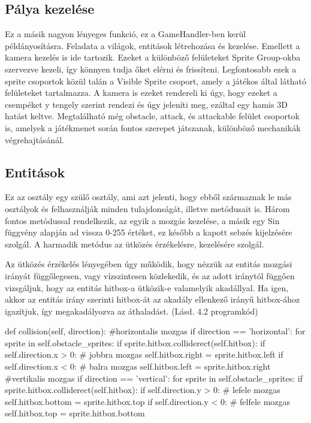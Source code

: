 \subsection{Pálya kezelése}
\indent \indent Ez a másik nagyon lényeges funkció, ez a GameHandler-ben kerül példányosításra. Feladata a világok, entitások létrehozása és kezelése. Emellett a kamera kezelés is ide tartozik. 
Ezeket a különböző felületeket Sprite Group-okba szervezve kezeli, így könnyen tudja őket elérni és frissíteni.
Legfontosabb ezek a sprite csoportok közül talán a Visible Sprite csoport, amely a játékos által látható felületeket tartalmazza. A kamera is ezeket rendereli ki úgy, hogy ezeket a csempéket y tengely szerint rendezi és úgy jeleníti meg, ezáltal egy hamis 3D hatást keltve.
Megtalálható még obstacle, attack, és attackable felület csoportok is, amelyek a játékmenet során fontos szerepet játszanak, különböző mechanikák végrehajtásánál.


\subsection{Entitások}
\indent \indent Ez az osztály egy szülő osztály, ami azt jelenti, hogy ebből származnak le más osztályok és felhasználják minden tulajdonságát, illetve metódusait is.  
Három fontos metódussal rendelkezik, az egyik a mozgás kezelése, a másik egy Sin függvény alapján ad vissza 0-255 értéket, ez később a kapott sebzés kijelzésére szolgál. A harmadik metódus az ütközés érzékelésre, kezelésére szolgál.

Az ütközés érzékelés lényegében úgy működik, hogy nézzük az entitás mozgási irányát függőlegesen, vagy vízszintesen közlekedik, és az adott iránytól függően vizsgáljuk, hogy az entitás hitbox-a ütközik-e valamelyik akadállyal. Ha igen, akkor az entitás irány szerinti hitbox-át az akadály ellenkező irányű hitbox-ához igazítjuk, így megakadályozva az áthaladást. (Lásd. 4.2 programkód)
\begin{python}[caption={Ütközés kezelés \cite{collision-handler}},label=py:Ütközés kezelés]
def collision(self, direction):
    #horizontalis mozgas
    if direction == 'horizontal':
        for sprite in self.obstacle_sprites:
            if sprite.hitbox.colliderect(self.hitbox):
                if self.direction.x > 0:
                # jobbra mozgas
                    self.hitbox.right = sprite.hitbox.left
                if self.direction.x < 0:
                # balra mozgas
                    self.hitbox.left = sprite.hitbox.right                   
    #vertikalis mozgas
    if direction == 'vertical':
        for sprite in self.obstacle_sprites:
            if sprite.hitbox.colliderect(self.hitbox):
                    if self.direction.y > 0:
                        # lefele mozgas
                        self.hitbox.bottom = sprite.hitbox.top
                        if self.direction.y < 0:
                        # felfele mozgas
                        self.hitbox.top = sprite.hitbox.bottom
                    \end{python} 

